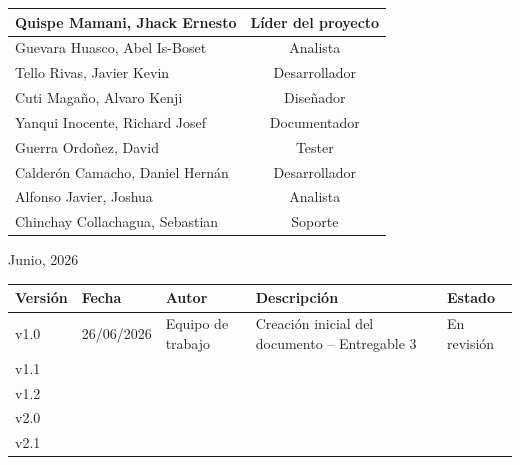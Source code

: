 \documentclass[11pt, a4paper, oneside]{report}
\begin{document}
\begin{titlepage}
\begin{tabular}{@{}|l|c|@{}}
    {\color{body_gray}\small Quispe Mamani, Jhack Ernesto} & {\color{body_gray}\small Líder del proyecto} \\ \hline
    {\color{body_gray}\small Guevara Huasco, Abel Is-Boset} & {\color{body_gray}\small Analista} \\ \hline
    {\color{body_gray}\small Tello Rivas, Javier Kevin} & {\color{body_gray}\small Desarrollador} \\ \hline
    {\color{body_gray}\small Cuti Magaño, Alvaro Kenji} & {\color{body_gray}\small Diseñador} \\ \hline
    {\color{body_gray}\small Yanqui Inocente, Richard Josef} & {\color{body_gray}\small Documentador} \\ \hline
    {\color{body_gray}\small Guerra Ordoñez, David} & {\color{body_gray}\small Tester} \\ \hline
    {\color{body_gray}\small Calderón Camacho, Daniel Hernán} & {\color{body_gray}\small Desarrollador} \\ \hline
    {\color{body_gray}\small Alfonso Javier, Joshua} & {\color{body_gray}\small Analista} \\ \hline
    {\color{body_gray}\small Chinchay Collachagua, Sebastian} & {\color{body_gray}\small Soporte} \\ \hline
  \end{tabular}

  \vspace{0.6cm}
  {\color{body_gray} Junio, 2026}

  \vspace*{\fill}

\end{titlepage}

\newpage
\thispagestyle{empty}
\vspace*{\fill}

{\centering
\begin{tabular}{@{}|C{1.5cm}|C{2.2cm}|L{3cm}|L{5cm}|C{2cm}|@{}}

  {\color{white}\bfseries\small Versión} &
  {\color{white}\bfseries\small Fecha} &
  {\color{white}\bfseries\small Autor} &
  {\color{white}\bfseries\small Descripción} &
  {\color{white}\bfseries\small Estado} \\ \hline

  \small v1.0 & \small 26/06/2026 & \small Equipo de trabajo &
  \small Creación inicial del documento -- Entregable 3 & \small En revisión \\ \hline

  \small v1.1 & \small & \small & \small & \small \\ \hline
  \small v1.2 & \small & \small & \small & \small \\ \hline
  \small v2.0 & \small & \small & \small & \small \\ \hline
  \small v2.1 & \small & \small & \small & \small \\ \hline
\end{tabular}
\par}
\end{document}

